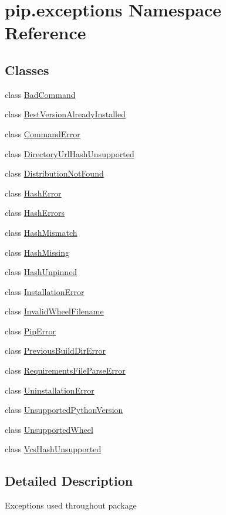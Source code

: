 \hypertarget{namespacepip_1_1exceptions}{}\section{pip.\+exceptions Namespace Reference}
\label{namespacepip_1_1exceptions}
\subsection*{Classes}
\begin{DoxyCompactItemize}
\item 
class \hyperlink{classpip_1_1exceptions_1_1_bad_command}{Bad\+Command}
\item 
class \hyperlink{classpip_1_1exceptions_1_1_best_version_already_installed}{Best\+Version\+Already\+Installed}
\item 
class \hyperlink{classpip_1_1exceptions_1_1_command_error}{Command\+Error}
\item 
class \hyperlink{classpip_1_1exceptions_1_1_directory_url_hash_unsupported}{Directory\+Url\+Hash\+Unsupported}
\item 
class \hyperlink{classpip_1_1exceptions_1_1_distribution_not_found}{Distribution\+Not\+Found}
\item 
class \hyperlink{classpip_1_1exceptions_1_1_hash_error}{Hash\+Error}
\item 
class \hyperlink{classpip_1_1exceptions_1_1_hash_errors}{Hash\+Errors}
\item 
class \hyperlink{classpip_1_1exceptions_1_1_hash_mismatch}{Hash\+Mismatch}
\item 
class \hyperlink{classpip_1_1exceptions_1_1_hash_missing}{Hash\+Missing}
\item 
class \hyperlink{classpip_1_1exceptions_1_1_hash_unpinned}{Hash\+Unpinned}
\item 
class \hyperlink{classpip_1_1exceptions_1_1_installation_error}{Installation\+Error}
\item 
class \hyperlink{classpip_1_1exceptions_1_1_invalid_wheel_filename}{Invalid\+Wheel\+Filename}
\item 
class \hyperlink{classpip_1_1exceptions_1_1_pip_error}{Pip\+Error}
\item 
class \hyperlink{classpip_1_1exceptions_1_1_previous_build_dir_error}{Previous\+Build\+Dir\+Error}
\item 
class \hyperlink{classpip_1_1exceptions_1_1_requirements_file_parse_error}{Requirements\+File\+Parse\+Error}
\item 
class \hyperlink{classpip_1_1exceptions_1_1_uninstallation_error}{Uninstallation\+Error}
\item 
class \hyperlink{classpip_1_1exceptions_1_1_unsupported_python_version}{Unsupported\+Python\+Version}
\item 
class \hyperlink{classpip_1_1exceptions_1_1_unsupported_wheel}{Unsupported\+Wheel}
\item 
class \hyperlink{classpip_1_1exceptions_1_1_vcs_hash_unsupported}{Vcs\+Hash\+Unsupported}
\end{DoxyCompactItemize}


\subsection{Detailed Description}
\begin{DoxyVerb}Exceptions used throughout package\end{DoxyVerb}
 